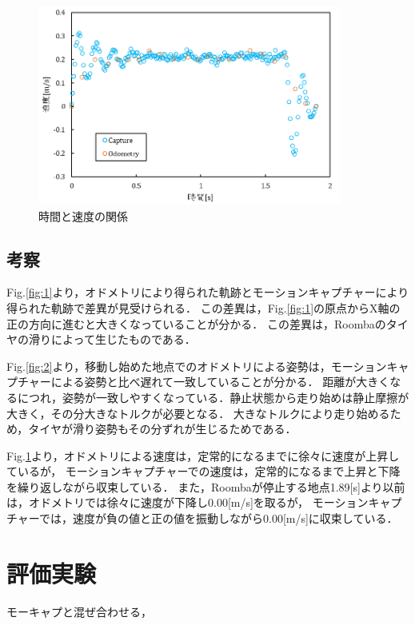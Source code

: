 \documentclass[a4paper,11pt]{jsarticle}
\begin{document}
\begin{figure}[H] %
        \begin{center}
        \includegraphics[width=100mm]{../graph/Velocityvs.Time.png}
        \caption{時間と速度の関係}%
        \label{fig:3}
        \end{center}
\end{figure}

\subsection{考察}
Fig.{\ref{fig:1}}より，オドメトリにより得られた軌跡とモーションキャプチャーにより得られた軌跡で差異が見受けられる．
この差異は，Fig.{\ref{fig:1}}の原点からX軸の正の方向に進むと大きくなっていることが分かる．
この差異は，Roombaのタイヤの滑りによって生じたものである．\par
Fig.{\ref{fig:2}}より，移動し始めた地点でのオドメトリによる姿勢は，モーションキャプチャーによる姿勢と比べ遅れて一致していることが分かる．
距離が大きくなるにつれ，姿勢が一致しやすくなっている．静止状態から走り始めは静止摩擦が大きく，その分大きなトルクが必要となる．
大きなトルクにより走り始めるため，タイヤが滑り姿勢もその分ずれが生じるためである．\par
Fig.{\ref{fig:3}}より，オドメトリによる速度は，定常的になるまでに徐々に速度が上昇しているが，
モーションキャプチャーでの速度は，定常的になるまで上昇と下降を繰り返しながら収束している．
また，Roombaが停止する地点1.89[s]より以前は，オドメトリでは徐々に速度が下降し0.00[m/s]を取るが，
モーションキャプチャーでは，速度が負の値と正の値を振動しながら0.00[m/s]に収束している．


\section{評価実験}
モーキャプと混ぜ合わせる，

\subsection{}

\section{}
\end{document}
